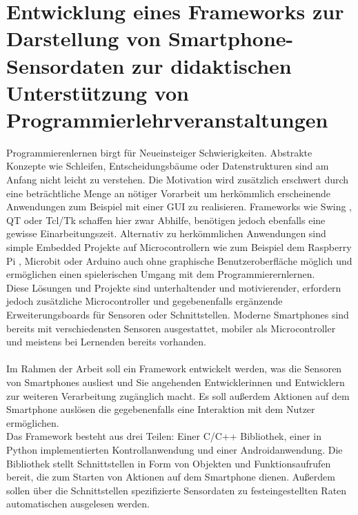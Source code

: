 \documentclass[11pt,a4paper]{article} %
\begin{document}

\section*{Entwicklung eines Frameworks zur Darstellung von Smartphone-Sensordaten
 zur didaktischen Unterstützung von Programmierlehrveranstaltungen} 
\label{sec:intro}
Programmierenlernen birgt für Neueinsteiger Schwierigkeiten.
Abstrakte Konzepte wie Schleifen, Entscheidungsbäume oder Datenstrukturen sind am Anfang nicht leicht zu verstehen.
Die Motivation wird zusätzlich erschwert durch eine beträchtliche Menge an nötiger Vorarbeit um herkömmlich erscheinende Anwendungen zum Beispiel mit einer GUI zu realisieren.
Frameworks wie Swing \cite{swing}, QT \cite{qt} oder Tcl/Tk \cite{tclktk} schaffen hier zwar Abhilfe, benötigen jedoch ebenfalls eine gewisse Einarbeitungszeit.
Alternativ zu herkömmlichen Anwendungen sind simple Embedded Projekte auf Microcontrollern wie zum Beispiel dem Raspberry Pi \cite{raspi}, Microbit\cite{microbit} oder Arduino\cite{arduino} auch ohne graphische Benutzeroberfläche möglich und ermöglichen einen spielerischen Umgang mit dem Programmierernlernen.
\\
Diese Lösungen und Projekte sind unterhaltender und motivierender, erfordern jedoch zusätzliche Microcontroller und gegebenenfalls ergänzende Erweiterungsboards für Sensoren oder Schnittstellen.
Moderne Smartphones sind bereits mit verschiedensten Sensoren ausgestattet, mobiler als Microcontroller und meistens bei Lernenden bereits vorhanden.
\\\\
Im Rahmen der Arbeit soll ein Framework entwickelt werden, was die Sensoren von Smartphones ausliest und Sie angehenden Entwicklerinnen und Entwicklern zur weiteren Verarbeitung zugänglich macht.
Es soll außerdem Aktionen auf dem Smartphone auslösen die gegebenenfalls eine Interaktion mit dem Nutzer ermöglichen.
\\
Das Framework besteht aus drei Teilen: Einer C/C++ Bibliothek, einer in Python implementierten Kontrollanwendung und einer Androidanwendung.
Die Bibliothek stellt Schnittstellen in Form von Objekten und Funktionsaufrufen bereit, die zum Starten von Aktionen auf dem Smartphone dienen.
Außerdem sollen über die Schnittstellen spezifizierte Sensordaten zu festeingestellten Raten automatischen ausgelesen werden.
\end{document}
